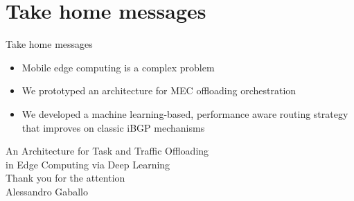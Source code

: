 \documentclass{beamer}
\begin{document}
\section*{Take home messages}
\begin{frame}{Take home messages}
\begin{itemize}
\item	Mobile edge computing is a complex problem\\
\pause
\item	We prototyped an architecture for MEC offloading orchestration\\
\pause
\item	We developed a machine learning-based, performance aware routing strategy that improves on classic iBGP mechanisms
\end{itemize}	
\end{frame} 

\begin{frame}[standout]
  \Large An Architecture for Task and Traffic Offloading \\in Edge Computing via Deep Learning\\
    \vspace{1cm}
	\large Thank you for the attention\\  
  \vspace{1cm}
  {\small Alessandro Gaballo}
\end{frame}
\end{document}
